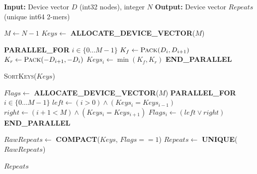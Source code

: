 \begin{algorithm}[t]
  \caption{GPU Parallel 2-mer Mining}
  \label{alg:gpu-mining}
  \begin{algorithmic}[1]
    \STATE \textbf{Input:} Device vector $D$ (int32 nodes), integer $N$
    \STATE \textbf{Output:} Device vector $Repeats$ (unique int64 2-mers)

    \STATE $M \gets N-1$
    \STATE $Keys \gets$ \textbf{ALLOCATE\_DEVICE\_VECTOR}($M$)

    \STATE {}
    \STATE \textbf{PARALLEL\_FOR} $i \in \{0 \dots M-1\}$
    \STATE \hspace{0.6cm} $K_f \gets \textsc{Pack}(D_i, D_{i+1})$
    \STATE \hspace{0.6cm} $K_r \gets \textsc{Pack}(-D_{i+1}, -D_i)$
    \STATE \hspace{0.6cm} $Keys_i \gets \min(K_f, K_r)$ 
    \STATE \textbf{END\_PARALLEL}

    \STATE {}
    \STATE \textsc{SortKeys}($Keys$) 

    \STATE {}
    \STATE $Flags \gets$ \textbf{ALLOCATE\_DEVICE\_VECTOR}($M$) 
    \STATE \textbf{PARALLEL\_FOR} $i \in \{0 \dots M-1\}$
    \STATE \hspace{0.6cm} $left  \gets (i>0) \wedge (Keys_i = Keys_{i-1})$
    \STATE \hspace{0.6cm} $right \gets (i+1<M) \wedge (Keys_i = Keys_{i+1})$
    \STATE \hspace{0.6cm} $Flags_i \gets (left \vee right)$
    \STATE \textbf{END\_PARALLEL}

    \STATE {}
    \STATE $RawRepeats \gets$ \textbf{COMPACT}($Keys$, $Flags==1$) 
    \STATE $Repeats \gets$ \textbf{UNIQUE}($RawRepeats$)

    \RETURN $Repeats$
  \end{algorithmic}
\end{algorithm}


